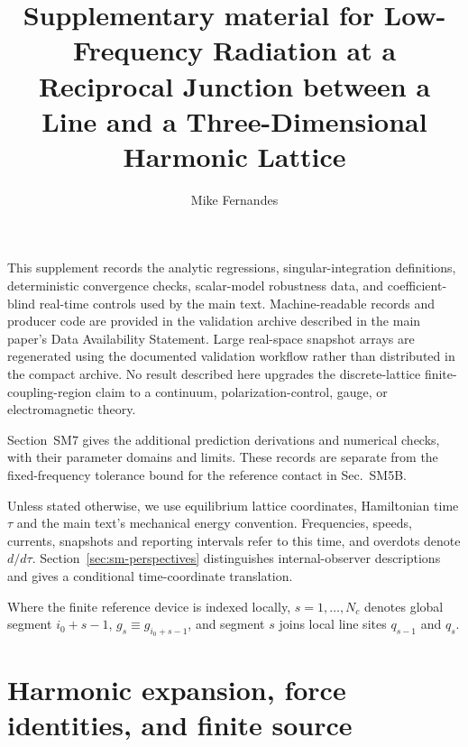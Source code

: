 \documentclass[10pt,aps,onecolumn,notitlepage,nofootinbib]{revtex4-2}
\begin{document}
\title{Supplementary material for Low-Frequency Radiation at a Reciprocal Junction between a Line and a Three-Dimensional Harmonic Lattice}
\author{Mike Fernandes}
\maketitle

This supplement records the analytic regressions, singular-integration definitions, deterministic convergence checks, scalar-model robustness data, and coefficient-blind real-time controls used by the main text. Machine-readable records and producer code are provided in the validation archive described in the main paper's Data Availability Statement. Large real-space snapshot arrays are regenerated using the documented validation workflow rather than distributed in the compact archive. No result described here upgrades the discrete-lattice finite-coupling-region claim to a continuum, polarization-control, gauge, or electromagnetic theory.

Section~SM7 gives the additional prediction derivations and numerical checks, with their parameter domains and limits. These records are separate from the fixed-frequency tolerance bound for the reference contact in Sec.~SM5B.

Unless stated otherwise, we use equilibrium lattice coordinates, Hamiltonian time $\tau$ and the main text's mechanical energy convention. Frequencies, speeds, currents, snapshots and reporting intervals refer to this time, and overdots denote $d/d\tau$. Section~\ref{sec:sm-perspectives} distinguishes internal-observer descriptions and gives a conditional time-coordinate translation.

Where the finite reference device is indexed locally, $s=1,\ldots,N_c$ denotes global segment $i_0+s-1$, $g_s\equiv g_{i_0+s-1}$, and segment $s$ joins local line sites $q_{s-1}$ and $q_s$.

\section{Harmonic expansion, force identities, and finite source}
\end{document}
